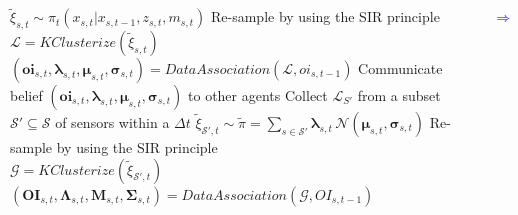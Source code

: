 \begin{frame}
\begin{columns}[T]
		{
			\begin{algorithm}[H]
				\tiny
				\BlankLine
				\BlankLine
				\BlankLine
				\Begin
				{
					$ \tilde{\xi}_{s,t} \sim \pi_t (x_{s,t} | x_{s,t-1},z_{s,t},m_{s,t}) $
					\BlankLine
					Re-sample by using the SIR principle\\
					\BlankLine
					$ \mathcal{L} = KClusterize(\tilde{\xi}_{s,t}) $
					\BlankLine
					$ (\boldsymbol{oi}_{s,t},\boldsymbol\lambda_{s,t},\boldsymbol\mu_{s,t},\boldsymbol\sigma_{s,t}) = DataAssociation(\mathcal{L}, oi_{s,t-1}) $
					\BlankLine
					Communicate belief $ (\boldsymbol{oi}_{s,t},\boldsymbol\lambda_{s,t},\boldsymbol\mu_{s,t},\boldsymbol\sigma_{s,t}) $ to other agents
				}
				\BlankLine
				\Begin
				{
					\textcolor{lightred}{Collect $ \mathcal{L}_{S'} $ from a subset $ \mathcal{S'} \subseteq \mathcal{S} $ of sensors within a $ \Delta t $}
					\BlankLine
					\textcolor{lightred}{$ \tilde{\xi}_{\mathcal{S'},t} \sim \tilde\pi = \sum_{s \in \mathcal{S'}} \boldsymbol\lambda_{s,t} \, \mathcal{N} (\boldsymbol\mu_{s,t},\boldsymbol\sigma_{s,t}) $}
					\BlankLine
					\textcolor{lightred}{Re-sample by using the SIR principle}\\
					\BlankLine
					\textcolor{lightred}{$ \mathcal{G} = KClusterize(\tilde\xi_{{\mathcal{S'},t}}) $}
					\BlankLine
					\textcolor{lightred}{$ (\boldsymbol{OI}_{s,t},\boldsymbol\Lambda_{s,t},\boldsymbol{M}_{s,t},\boldsymbol\Sigma_{s,t}) = DataAssociation(\mathcal{G},OI_{s,t-1}) $}
				}
			\end{algorithm}
			
			
			\Huge
			\vspace{2.15cm}
			
			\begin{center}
				\textcolor{blue}{$ \Rightarrow $}
			\end{center}
			
			
			\centering
			
}
\end{columns}
\end{frame}
